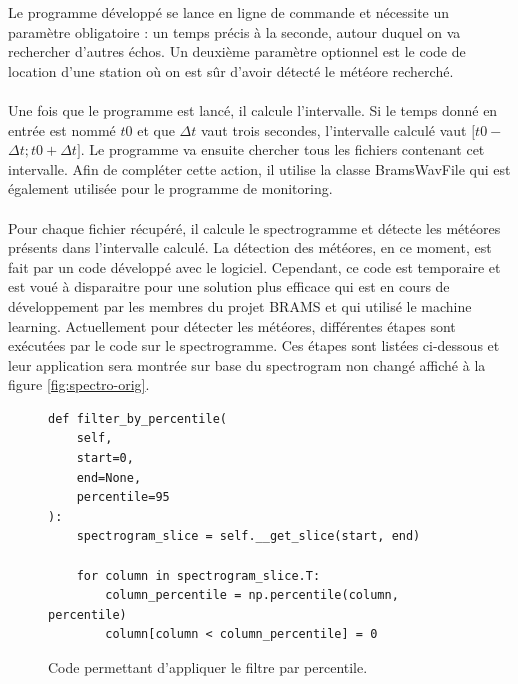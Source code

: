 \documentclass[11pt]{article}
\begin{document}
Le programme développé se lance en ligne de commande et nécessite un paramètre obligatoire : un temps précis à la seconde, autour duquel on va rechercher d'autres échos.
Un deuxième paramètre optionnel est le code de location d'une station où on est sûr d'avoir détecté le météore recherché.\\
\\
Une fois que le programme est lancé, il calcule l'intervalle.
Si le temps donné en entrée est nommé \(t0\) et que $\Delta$\(t\) vaut trois secondes, l'intervalle calculé vaut \([t0 - \)$\Delta$\(t ; t0 + \)$\Delta$\(t]\).
Le programme va ensuite chercher tous les fichiers contenant cet intervalle.
Afin de compléter cette action, il utilise la classe BramsWavFile qui est également utilisée pour le programme de monitoring.\\
\\
Pour chaque fichier récupéré, il calcule le spectrogramme et détecte les météores présents dans l'intervalle calculé.
La détection des météores, en ce moment, est fait par un code développé avec le logiciel.
Cependant, ce code est temporaire et est voué à disparaitre pour une solution plus efficace qui est en cours de développement par les membres du projet BRAMS et qui utilisé le machine learning.
Actuellement pour détecter les météores, différentes étapes sont exécutées par le code sur le spectrogramme.
Ces étapes sont listées ci-dessous et leur application sera montrée sur base du spectrogram non changé affiché à la figure \ref{fig:spectro-orig}.

\begin{figure}[h]
    \begin{lstlisting}[style=CStyle]
def filter_by_percentile(
    self,
    start=0,
    end=None,
    percentile=95
):
    spectrogram_slice = self.__get_slice(start, end)

    for column in spectrogram_slice.T:
        column_percentile = np.percentile(column, percentile)
        column[column < column_percentile] = 0
    \end{lstlisting}
    \caption{Code permettant d'appliquer le filtre par percentile.}
    \label{fig:percentile-code}
\end{figure}
\end{document}
